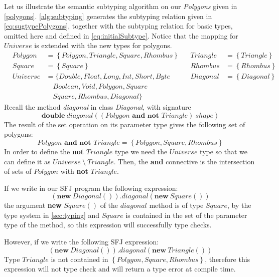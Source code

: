\documentclass[runningheads]{llncs}
\begin{document}
Let us illustrate the semantic subtyping algorithm on our \emph{Polygons} given in \autoref{polygons}.
\autoref{alg:subtyping} generates the subtyping relation given in \autoref{eq:sugtypePolygons}, together with the subtyping relation for basic types, omitted here and defined in \autoref{eq:initialSubtype}. Notice that the mapping for $Universe$ is extended with the new types for polygons.
\begin{equation}
    \label{eq:sugtypePolygons}
    \begin{array}{llllll}
         & Polygon  & = \left\{Polygon, Triangle, Square, Rhombus \right\} &  & Triangle & = \left\{Triangle\right\}           \\
         & Square   & = \left\{Square\right\}                              &  & Rhombus  & = \left\{Rhombus\right\}            \\
         & Universe & = \{Double, Float, Long, Int, Short, Byte                                                              &  & Diagonal & = \left\{Diagonal\right\}          \\
         &          & \quad Boolean, Void, Polygon, Square                                                                     \\
         &          & \quad Square, Rhombus, Diagonal\}
    \end{array}
\end{equation}
Recall the method \emph{diagonal} in class \emph{Diagonal}, with signature
$$
\mathbf{double}\ diagonal((\textit{Polygon} \textbf{ and not }  \textit{Triangle}) \ shape)
$$
The result of the set operation on its parameter type gives the following set of polygons:
$$
Polygon \textbf{ and not } Triangle = \left\{Polygon, Square, Rhombus \right\}
$$
In order to define the \textbf{not} $Triangle$ type we need the $Universe$ type so that we can define it as $Universe\ \mathbf{\setminus}\ Triangle$. Then, the \textbf{and} connective is the intersection of sets of $Polygon$ with \textbf{not} $Triangle$.

If we write in our SFJ program the following expression:
$$
    (\textbf{new}\ Diagonal()).diagonal(\textbf{new}\ Square())
$$
the argument \textbf{new} $Square()$ of the $diagonal$ method is of type $Square$, by the type system in \autoref{sec:typing} and $Square$ is contained in the set of the parameter type of the method, so this expression will successfully type checks.

However, if we write the following SFJ expression:
$$
    (\textbf{new}\ Diagonal()).diagonal(\textbf{new}\ Triangle())
$$
Type $Triangle$ is not contained in $\left\{Polygon, Square, Rhombus \right\}$, therefore this expression will not type check and will return a type error at compile time.
\end{document}
